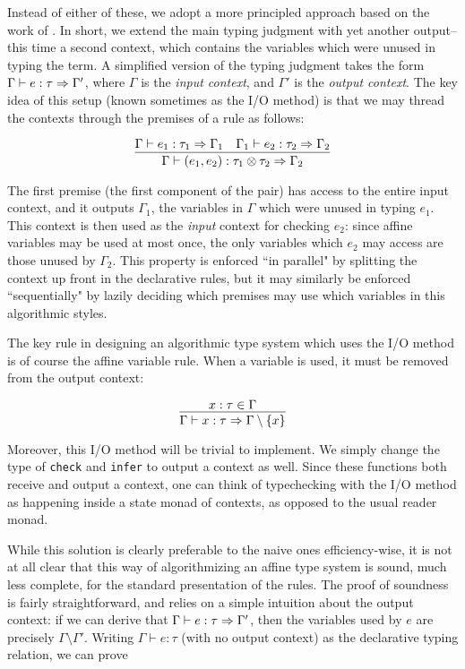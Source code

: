 Instead of either of these, we adopt a more principled approach based on the work of \citet{cervesato:tcs00}. In short, we extend the main typing judgment with yet another output-- this time a second context, which contains the variables which were unused in typing the term. A simplified version of the typing judgment takes the form $\Gamma \vdash e : \tau \Rightarrow \Gamma'$, where $\Gamma$ is the \textit{input context}, and $\Gamma'$ is the \textit{output context}. The key idea of this setup (known sometimes as the I/O method) is that we may thread the contexts through the premises of a rule as follows:

$$
\infer{\Gamma \vdash (e_1,e_2) : \tau_1 \otimes \tau_2 \gens \Gamma_2}{\Gamma \vdash e_1 : \tau_1 \gens \Gamma_1 & \Gamma_1 \vdash e_2 : \tau_2 \gens \Gamma_2}
$$

The first premise (the first component of the pair) has access to the entire input context, and it outputs $\Gamma_1$, the variables in $\Gamma$ which were unused in typing $e_1$. This context is then used as the \textit{input} context for checking $e_2$: since affine variables may be used at most once, the only variables which $e_2$ may access are those unused by $\Gamma_2$. This property is enforced ``in parallel" by splitting the context up front in the declarative rules, but it may similarly be enforced ``sequentially" by lazily deciding which premises may use which variables in this algorithmic styles.

The key rule in designing an algorithmic type system which uses the I/O method is of course the affine variable rule. When a variable is used, it must be removed from the output context:

$$
\infer{\Gamma \vdash x : \tau \gens \Gamma \setminus \{x\}}{x : \tau \in \Gamma}
$$

Moreover, this I/O method will be trivial to implement. We simply change the type of \texttt{check} and \texttt{infer} to output a context as well. Since these functions both receive and output a context, one can think of typechecking with the I/O method as happening inside a state monad of contexts, as opposed to the usual reader monad.

While this solution is clearly preferable to the naive ones efficiency-wise, it is not at all clear that this way of algorithmizing an affine type system is sound, much less complete, for the standard presentation of the rules. The proof of soundness is fairly straightforward, and relies on a simple intuition about the output context: if we can derive that $\Gamma \vdash e : \tau \Rightarrow \Gamma'$, then the variables used by $e$ are precisely $\Gamma \setminus \Gamma'$. Writing $\Gamma \vdash e : \tau$ (with no output context) as the declarative typing relation, we can prove

